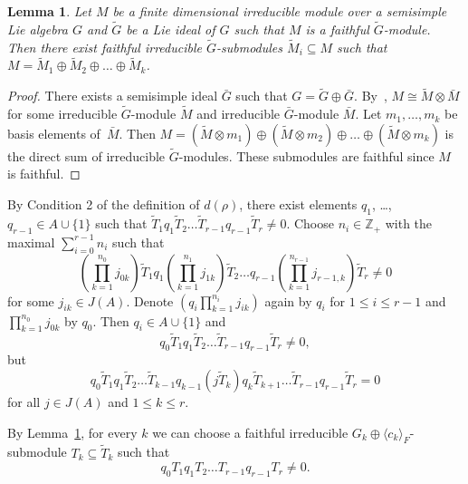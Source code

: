 \documentclass[12pt, reqno, a4paper]{amsart}
\theoremstyle{plain}
\newtheorem{lemma}{Lemma}
\theoremstyle{remark}
\theoremstyle{definition}
\begin{document}
\begin{lemma}\label{ChooseSubmodule}
Let $M$ be a finite dimensional irreducible module
over a semisimple Lie algebra $G$
and $\tilde G$ be a Lie ideal of $G$
such that $M$ is a faithful $\tilde G$-module. Then there exist
faithful irreducible $\tilde G$-submodules
$\tilde M_i \subseteq M$
such that $M = \tilde M_1 \oplus \tilde M_2 \oplus \dots
\oplus \tilde M_k$.
\end{lemma}
\begin{proof}
There exists a semisimple ideal $\bar G$ such that $G = \tilde G \oplus \bar G$.
By~\cite[Proposition 7.3.1']{GotoGrosshans}, $M \cong \tilde M \otimes \bar M$
for some irreducible $\tilde G$-module $\tilde M$
and irreducible $\bar G$-module $\bar M$. Let $m_1, \ldots, m_k$ be basis elements
of~$\bar M$.
Then $M = (\tilde M \otimes m_1)\oplus(\tilde M \otimes m_2)\oplus\dots\oplus
(\tilde M \otimes m_k)$ is the direct sum of irreducible $\tilde G$-modules.
These  submodules are faithful
since $M$ is faithful.
\end{proof}

 By Condition 2 of the definition of $d(\rho)$,
 there exist elements $q_1$, \ldots, $q_{r-1} \in A \cup \{1\}$
such that $\tilde T_1 q_1 \tilde  T_2 \ldots \tilde  T_{r-1} q_{r-1}
\tilde  T_r \ne 0$.
 Choose $n_i \in \mathbb Z_+$ with the maximal $\sum\limits_{i=0}^{r-1} n_i$ such that
$$\left(\prod_{k=1}^{n_0} j_{0k}\right)\tilde T_1 q_1
 \left(\prod_{k=1}^{n_1} j_{1k}\right) \tilde T_2
  \ldots q_{r-1} \left(\prod_{k=1}^{n_{r-1}} j_{r-1,k}\right) \tilde T_r \ne 0
$$ for some $j_{ik}\in J(A)$.
Denote $\left( q_i \prod_{k=1}^{n_i} j_{ik} \right)$ again by
$q_i$ for $1 \leqslant i \leqslant r-1$
and $\prod_{k=1}^{n_0} j_{0k}$ by $q_0$.
Then $q_i  \in A \cup \{1\}$ and
$$q_0 \tilde T_1 q_1 \tilde T_2 \ldots \tilde T_{r-1} q_{r-1}
\tilde T_r \ne 0,$$ but
\begin{equation}\label{EquationJZero}
q_0 \tilde T_1 q_1 \tilde  T_2 \ldots \tilde  T_{k-1} q_{k-1} (j \tilde  T_{k}) q_{k} \tilde T_{k+1} \ldots \tilde  T_{r-1} q_{r-1}
\tilde T_r = 0\end{equation}
for all $j \in J(A)$ and $1 \leqslant k \leqslant r$.

By Lemma~\ref{ChooseSubmodule}, for every $k$ we can choose a
   faithful irreducible
$G_k \oplus \langle c_k \rangle_F$-submodule $T_k \subseteq \tilde T_k$
such that
\begin{equation}\label{EquationqNonZero}q_0 T_1 q_1 T_2 \ldots T_{r-1} q_{r-1}
T_r \ne 0.\end{equation}
\end{document}
